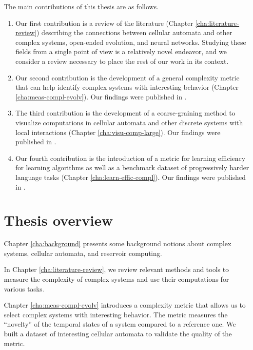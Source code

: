 The main contributions of this thesis are as follows.
\begin{enumerate}
  \item Our first contribution is a review of the literature (Chapter \ref{cha:literature-review})
        describing the connections between cellular automata
        and other complex systems, open-ended evolution, and neural networks.
        Studying these fields from a single point of view is a relatively novel
        endeavor, and we consider a review necessary to place the rest of our
        work in its context.

  \item Our second contribution is the development of a general complexity metric that can help identify
        complex systems with interesting behavior (Chapter \ref{cha:meas-compl-evolv}). Our findings were published in \cite{cisnerosEvolvingStructuresComplex2019}.

  \item The third contribution is the development of a coarse-graining method to visualize computations in
        cellular automata and other discrete systems with local interactions (Chapter \ref{cha:visu-comp-large}). Our findings were published in \cite{cisnerosVisualizingComputationLargescale2020}.

  \item Our fourth contribution is the introduction of a metric for learning efficiency for learning
        algorithms as well as a benchmark dataset of progressively harder
        language tasks (Chapter \ref{cha:learn-effic-compl}). Our findings were published in \cite{cisnerosBenchmarkingLearningEfficiency2022}.
\end{enumerate}

\section{Thesis overview}


Chapter \ref{cha:background} presents some background notions about complex
systems, cellular automata, and reservoir computing.

In Chapter \ref{cha:literature-review}, we review relevant methods and tools to measure the complexity of complex systems and use their computations for
various tasks.

Chapter \ref{cha:meas-compl-evolv} introduces a complexity metric that allows us 
to select complex systems with interesting behavior. The metric measures the
``novelty'' of the temporal states of a system compared to a reference one. We
built a dataset of interesting cellular automata to validate the quality of the
metric.

